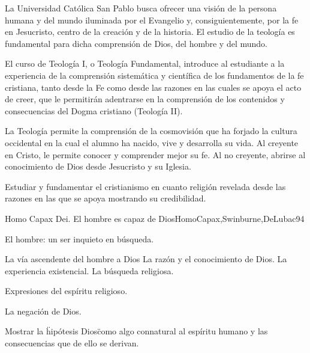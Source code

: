 \begin{syllabus}


\begin{justification}
La Universidad Católica San Pablo busca ofrecer una visión de la persona humana y del mundo iluminada por el Evangelio y, consiguientemente, por la fe en Jesucristo, centro de la creación y de la historia. El estudio de la teología es fundamental para dicha comprensión de Dios, del hombre y del mundo.

El curso de Teología I, o Teología Fundamental, introduce al estudiante a la experiencia de la comprensión sistemática y científica de los fundamentos de la fe cristiana, tanto desde la Fe como desde las razones en las cuales se apoya el acto de creer, que le permitirán adentrarse en la comprensión de los contenidos y consecuencias del Dogma cristiano (Teología II).

La Teología permite la comprensión de la cosmovisión que ha forjado la cultura occidental en la cual el alumno ha nacido, vive y desarrolla su vida. Al creyente en Cristo, le permite conocer y comprender mejor su fe. Al no creyente, abrirse al conocimiento de Dios desde Jesucristo y su Iglesia.
\end{justification}

\begin{goals}
\item Estudiar y fundamentar el cristianismo en cuanto religión revelada desde las razones en las que se apoya mostrando su credibilidad. 
\end{goals}

\begin{outcomes}
\end{outcomes}

\begin{unit}{Homo Capax Dei. El hombre es capaz de Dios}{HomoCapax,Swinburne,DeLubac}{9}{4}
\begin{topics}
	\item El hombre: un ser inquieto en búsqueda.
	\item	La vía ascendente del hombre a Dios
		\subitem	La razón y el conocimiento de Dios.
		\subitem	La experiencia existencial.
		\subitem	La búsqueda religiosa.
	\item	Expresiones del espíritu religioso.
	\item	La negación de Dios.
\end{topics}
\begin{unitgoals}
	\item Mostrar la \"hipótesis Dios\" como algo connatural al espíritu humano y las consecuencias que de ello se derivan.
\end{unitgoals}
\end{unit}


\end{syllabus}
